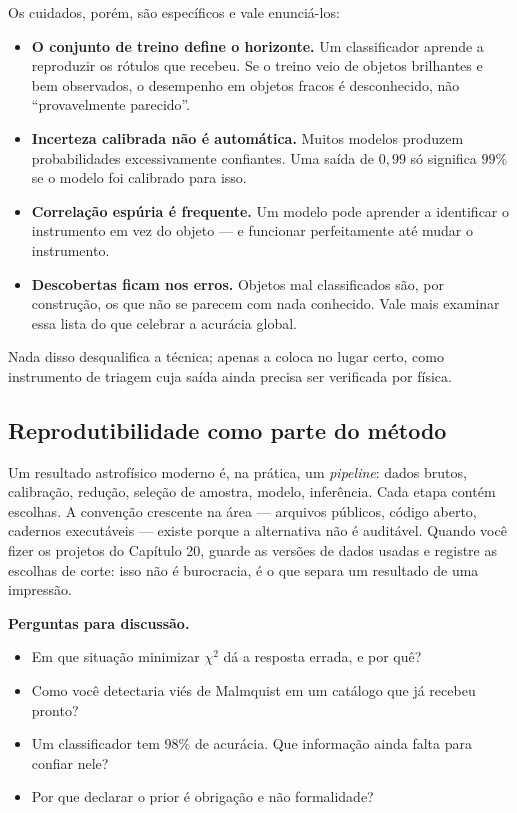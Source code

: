 \documentclass[11pt,a4paper]{article}
\begin{document}
Os cuidados, porém, são específicos e vale enunciá-los:

\begin{itemize}
\item \textbf{O conjunto de treino define o horizonte.} Um classificador aprende a reproduzir os rótulos que recebeu. Se o treino veio de objetos brilhantes e bem observados, o desempenho em objetos fracos é desconhecido, não ``provavelmente parecido''.
\item \textbf{Incerteza calibrada não é automática.} Muitos modelos produzem probabilidades excessivamente confiantes. Uma saída de $0{,}99$ só significa $99\%$ se o modelo foi calibrado para isso.
\item \textbf{Correlação espúria é frequente.} Um modelo pode aprender a identificar o instrumento em vez do objeto --- e funcionar perfeitamente até mudar o instrumento.
\item \textbf{Descobertas ficam nos erros.} Objetos mal classificados são, por construção, os que não se parecem com nada conhecido. Vale mais examinar essa lista do que celebrar a acurácia global.
\end{itemize}

Nada disso desqualifica a técnica; apenas a coloca no lugar certo, como instrumento de triagem cuja saída ainda precisa ser verificada por física.

\subsection*{Reprodutibilidade como parte do método}

Um resultado astrofísico moderno é, na prática, um \emph{pipeline}: dados brutos, calibração, redução, seleção de amostra, modelo, inferência. Cada etapa contém escolhas. A convenção crescente na área --- arquivos públicos, código aberto, cadernos executáveis --- existe porque a alternativa não é auditável. Quando você fizer os projetos do Capítulo 20, guarde as versões de dados usadas e registre as escolhas de corte: isso não é burocracia, é o que separa um resultado de uma impressão.

\textbf{Perguntas para discussão.}
\begin{itemize}
\item Em que situação minimizar $\chi^2$ dá a resposta errada, e por quê?
\item Como você detectaria viés de Malmquist em um catálogo que já recebeu pronto?
\item Um classificador tem $98\%$ de acurácia. Que informação ainda falta para confiar nele?
\item Por que declarar o prior é obrigação e não formalidade?
\end{itemize}
\end{document}
